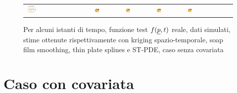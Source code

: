 \documentclass[a4paper,11pt,twoside,openright]{book}							%
\begin{document}
\begin{landscape}
\begin{figure}
\begin{tabular}{lcccccccc}
\includegraphics[trim=0.8cm 0.8cm 2.5cm 1.2cm,clip=true,width=0.19\textwidth,valign=t]{Immagini/simulazioni/Dati_tempo4.png}&
\includegraphics[trim=0cm 0cm 0cm 1.8cm,clip=true,width=0.19\textwidth,valign=t]{Immagini/simulazioni/KRIGtempo4.png}&
\includegraphics[trim=0cm 0cm 0cm 1.8cm,clip=true,width=0.19\textwidth,valign=t]{Immagini/simulazioni/TPStempo4.png}&
\includegraphics[trim=0cm 0cm 0cm 1.8cm,clip=true,width=0.19\textwidth,valign=t]{Immagini/simulazioni/SOAPtempo4.png}&
\includegraphics[trim=0cm 0cm 0cm 1.8cm,clip=true,width=0.19\textwidth,valign=t]{Immagini/simulazioni/STSRtempo4.png}&

\end{tabular}
\caption{Per alcuni istanti di tempo, funzione test $f(\protect\underline{p},t)$ reale, dati simulati, stime ottenute rispettivamente con kriging spazio-temporale, soap film smoothing, thin plate splines e ST-PDE, caso senza covariata}
\label{fig:confronto_altri_metodi_nocov}
\end{figure}
\end{landscape}

\section{Caso con covariata}
\end{document}
